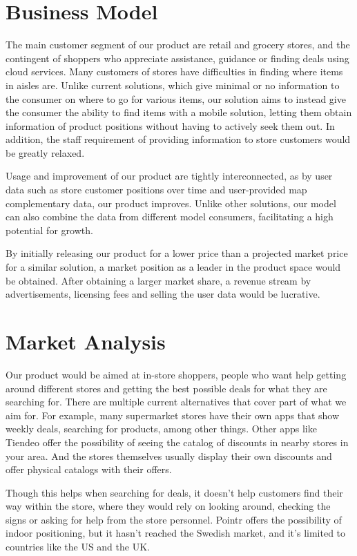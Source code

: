\documentclass[titlepage]{article}
\begin{document}
\section{Business Model}
The main customer segment of our product are retail and grocery stores, and the contingent of shoppers who appreciate assistance, 
guidance or finding deals using cloud services. 
Many customers of stores have difficulties in finding where items in aisles are.
Unlike current solutions, which give minimal or no information to the consumer on where to go for various items,
our solution aims to instead give the consumer the ability to find items with a mobile solution,
letting them obtain information of product positions without having to actively seek them out.
In addition, the staff requirement of providing information to store customers would be greatly relaxed.

Usage and improvement of our product are tightly interconnected, as by user data such as store customer positions over time 
and user-provided map complementary data, our product improves. 
Unlike other solutions, our model can also combine the data from different model consumers, 
facilitating a high potential for growth.

By initially releasing our product for a lower price than a projected market price for a similar solution,
a market position as a leader in the product space would be obtained.
After obtaining a larger market share, a revenue stream by advertisements, 
licensing fees and selling the user data would be lucrative.

\section{Market Analysis}
Our product would be aimed at in-store shoppers, people who want help getting around different stores and getting the best possible deals for what they are searching for. There are multiple current alternatives that cover part of what we aim for. For example, many supermarket stores have their own apps that show weekly deals, searching for products, among other things. Other apps like Tiendeo offer the possibility of seeing the catalog of discounts in nearby stores in your area. And the stores themselves usually display their own discounts and offer physical catalogs with their offers. 

Though this helps when searching for deals, it doesn’t help customers find their way within the store, where they would rely on looking around, checking the signs or asking for help from the store personnel. Pointr offers the possibility of indoor positioning, but it hasn’t reached the Swedish market, and it’s limited to countries like the US and the UK. 
\end{document}
